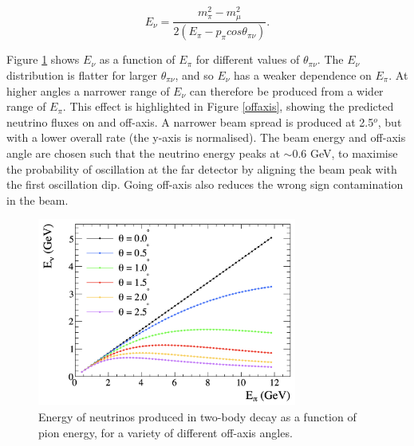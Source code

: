 \begin{equation}
E_{\nu} = \frac{m^{2}_{\pi} - m^{2}_{\mu}}{2(E_{\pi} - p_{\pi} cos\theta_{\pi\nu})}.
\end{equation}

Figure \ref{offaxisEdep} shows $E_\nu$ as a function of $E_\pi$ for different values of $\theta_{\pi\nu}$. The $E_\nu$ distribution is flatter for larger $\theta_{\pi\nu}$, and so $E_\nu$ has a weaker dependence on $E_\pi$. At higher angles a narrower range of $E_\nu$ can therefore be produced from a wider range of $E_\pi$. This effect is highlighted in Figure \ref{offaxis}, showing the predicted neutrino fluxes on and off-axis. A narrower beam spread is produced at 2.5$^o$, but with a lower overall rate (the y-axis is normalised). The beam energy and off-axis angle are chosen such that the neutrino energy peaks at $\sim$0.6 GeV, to maximise the probability of oscillation at the far detector by aligning the beam peak with the first oscillation dip. Going off-axis also reduces the wrong sign contamination in the beam. 

\begin{figure}[!htbp]
\centering
\includegraphics*[width=0.76\textwidth,clip]{figs/offAxisEnergyDep}
\caption{Energy of neutrinos produced in two-body decay as a function of pion energy, for a variety of different off-axis angles.} \label{offaxisEdep}
\end{figure}

